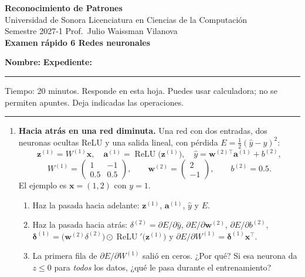 \documentclass[11pt]{article}
\newcommand{\vx}{\mathbf{x}}
\newcommand{\T}{^{\top}}
\newcommand{\encabezado}[2]{%
\begin{center}
{\large\bfseries Reconocimiento de Patrones}\\[2pt]
Universidad de Sonora \textperiodcentered{} Licenciatura en Ciencias de la Computación\\
Semestre 2027-1 \textperiodcentered{} Prof.\ Julio Waissman Vilanova\\[10pt]
{\Large\bfseries #1}%
\ifdefined\tipodoc\\[4pt]{\large\itshape\tipodoc}\fi
\end{center}
\ifdefined\tipodoc\else
\vspace{6pt}
\textbf{Nombre:} \hrulefill\quad \textbf{Expediente:} \rule{3.5cm}{0.4pt}\par
\vspace{6pt}
\fi
#2
\par\medskip\hrule\medskip
}
\newcommand{\espacio}[1]{\par\vspace{#1}}
\begin{document}
\encabezado{Examen rápido 6 \textperiodcentered{} Redes neuronales}{%
Tiempo: 20 minutos. Responde en esta hoja. Puedes usar calculadora; no se permiten apuntes. Deja indicadas las operaciones.}

\begin{enumerate}

\item \textbf{Hacia atrás en una red diminuta.} Una red con dos entradas, dos neuronas ocultas ReLU y una salida lineal, con pérdida $E = \frac12(\hat y - y)^2$:
\[
\mathbf z^{(1)} = W^{(1)}\vx, \quad \mathbf a^{(1)} = \operatorname{ReLU}\big(\mathbf z^{(1)}\big), \quad \hat y = \mathbf w^{(2)\top}\mathbf a^{(1)} + b^{(2)},
\]
\[
W^{(1)} = \begin{pmatrix} 1 & -1 \\ 0.5 & 0.5 \end{pmatrix}, \qquad \mathbf w^{(2)} = \begin{pmatrix} 2 \\ -1 \end{pmatrix}, \qquad b^{(2)} = 0.5 .
\]
El ejemplo es $\vx = (1, 2)$ con $y = 1$.
\begin{enumerate}
  \item Haz la pasada hacia adelante: $\mathbf z^{(1)}$, $\mathbf a^{(1)}$, $\hat y$ y $E$.
  \espacio{2.5cm}

  \item Haz la pasada hacia atrás: $\delta^{(2)} = \partial E/\partial \hat y$, $\partial E/\partial \mathbf w^{(2)}$, $\partial E / \partial b^{(2)}$, $\boldsymbol\delta^{(1)} = \big(\mathbf w^{(2)}\delta^{(2)}\big) \odot \operatorname{ReLU}'\big(\mathbf z^{(1)}\big)$ y $\partial E/\partial W^{(1)} = \boldsymbol\delta^{(1)}\vx\T$.
  \espacio{4.5cm}

  \item La primera fila de $\partial E/\partial W^{(1)}$ salió en ceros. ¿Por qué? Si esa neurona da $z \le 0$ para \emph{todos} los datos, ¿qué le pasa durante el entrenamiento?
  \espacio{2.2cm}
\end{enumerate}


\end{enumerate}
\end{document}
